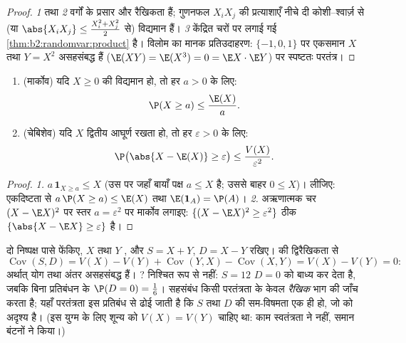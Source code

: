 \begin{proof}
\emph{1} तथा \emph{2} वर्गों के प्रसार और रैखिकता हैं; गुणनफल $X_iX_j$
की प्रत्याशाएँ नीचे दी कोशी--श्वार्ज़ से (या $\abs{X_iX_j} \leq \frac{X_i^2 + X_j^2}{2}$ से) विद्यमान हैं।
\emph{3} केंद्रित चरों पर लगाई गई \cref{thm:b2:randomvar:product} है। विलोम का मानक
प्रतिउदाहरण: $\{-1, 0, 1\}$ पर एकसमान $X$ तथा $Y = X^2$ असहसंबद्ध हैं ($\E(XY) = \E(X^3) = 0 = \E X \cdot \E Y$) पर
स्पष्टतः परतंत्र।
\end{proof}

\begin{theorem}[मार्कोव तथा चेबिशेव
असमिकाएँ]\label{thm:b2:randomvar:markov}
\leavevmode
\begin{enumerate}
\item (मार्कोव) यदि $X \geq 0$ की  विद्यमान हो, तो हर $a
> 0$ के
लिए:
\[
\P(X \geq a) \leq \frac{\E(X)}{a} .
\]
\item (चेबिशेव) यदि $X$ द्वितीय आघूर्ण रखता हो, तो हर $\varepsilon > 0$ के लिए:
\[
\P\bigl(\abs{X - \E(X)} \geq \varepsilon\bigr)
\leq \frac{V(X)}{\varepsilon^2} .
\]
\end{enumerate}
\end{theorem}

\begin{proof}
\emph{1.}  $a\,\mathbf{1}_{X \geq a} \leq X$ (उस  पर जहाँ बायाँ पक्ष $a \leq X$ है; उससे
बाहर $0 \leq X$)।  लीजिए: एकदिष्टता से $a\,\P(X \geq a) \leq \E(X)$ तथा $\E(\mathbf{1}_A) = \P(A)$।
\emph{2.} अऋणात्मक चर $(X - \E
X)^2$ पर स्तर $a = \varepsilon^2$ पर मार्कोव लगाइए:  $\{(X - \E X)^2
\geq \varepsilon^2\}$
ठीक $\{\abs{X - \E X} \geq
\varepsilon\}$ है।
\end{proof}

\begin{example}\label{ex:b2:randomvar:sumdiff}
दो निष्पक्ष पासे फेंकिए, $X$ तथा $Y$ , और $S = X +
Y$, $D = X - Y$ रखिए।
 की द्विरैखिकता से
\[
\operatorname{Cov}(S, D) = V(X) - V(Y) +
\operatorname{Cov}(Y, X) - \operatorname{Cov}(X, Y) = V(X) -
V(Y) = 0 :
\]
अर्थात् योग तथा अंतर असहसंबद्ध हैं। ? निश्चित रूप से नहीं:
$S = 12$ $D = 0$ को बाध्य कर देता है, जबकि बिना प्रतिबंधन के $\P(D = 0) =
\frac16$। सहसंबंध
किसी परतंत्रता के केवल \emph{रैखिक} भाग की जाँच करता है; यहाँ
परतंत्रता इस प्रतिबंध से ढोई जाती है कि $S$ तथा $D$ की सम-विषमता
एक ही हो, जो  को अदृश्य है। (इस युग्म के लिए शून्य 
को $V(X) = V(Y)$ चाहिए था: काम स्वतंत्रता ने नहीं, समान बंटनों ने किया।)
\end{example}


